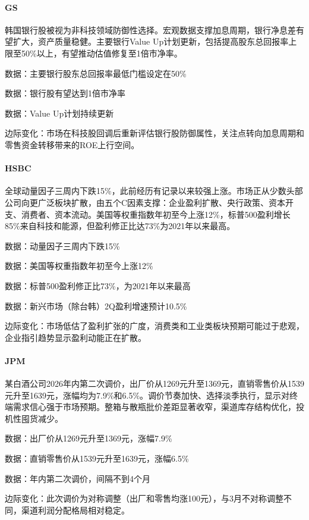 \documentclass[11pt]{ctexart}
\begin{document}
\paragraph{GS} 韩国银行股被视为非科技领域防御性选择。宏观数据支撑加息周期，银行净息差有望扩大，资产质量稳健。主要银行Value Up计划更新，包括提高股东总回报率上限至50\%以上，有望推动估值修复至1倍市净率。
{\small\color{refgray}数据：主要银行股东总回报率最低门槛设定在50\%\par}
{\small\color{refgray}数据：银行股有望达到1倍市净率\par}
{\small\color{refgray}数据：Value Up计划持续更新\par}
{\small\color{refgray}边际变化：市场在科技股回调后重新评估银行股防御属性，关注点转向加息周期和零售资金转移带来的ROE上行空间。\par}
\paragraph{HSBC} 全球动量因子三周内下跌15\%，此前经历有记录以来较强上涨。市场正从少数头部公司向更广泛板块扩散，由五个C因素支撑：企业盈利扩散、央行政策、资本开支、消费者、资本流动。美国等权重指数年初至今上涨12\%，标普500盈利增长85\%来自科技和能源，但盈利修正比达73\%为2021年以来最高。
{\small\color{refgray}数据：动量因子三周内下跌15\%\par}
{\small\color{refgray}数据：美国等权重指数年初至今上涨12\%\par}
{\small\color{refgray}数据：标普500盈利修正比73\%，为2021年以来最高\par}
{\small\color{refgray}数据：新兴市场（除台韩）2Q盈利增速预计10.5\%\par}
{\small\color{refgray}边际变化：市场低估了盈利扩张的广度，消费类和工业类板块预期可能过于悲观，企业指引趋势显示盈利动能正在扩散。\par}
\paragraph{JPM} 某白酒公司2026年内第二次调价，出厂价从1269元升至1369元，直销零售价从1539元升至1639元，涨幅均为7.9\%和6.5\%。调价节奏加快、选择淡季执行，显示对终端需求信心强于市场预期。整箱与散瓶批价差距显著收窄，渠道库存结构优化，投机性囤货减少。
{\small\color{refgray}数据：出厂价从1269元升至1369元，涨幅7.9\%\par}
{\small\color{refgray}数据：直销零售价从1539元升至1639元，涨幅6.5\%\par}
{\small\color{refgray}数据：年内第二次调价，间隔不到4个月\par}
{\small\color{refgray}边际变化：此次调价为对称调整（出厂和零售均涨100元），与3月不对称调整不同，渠道利润分配格局相对稳定。\par}
\end{document}
